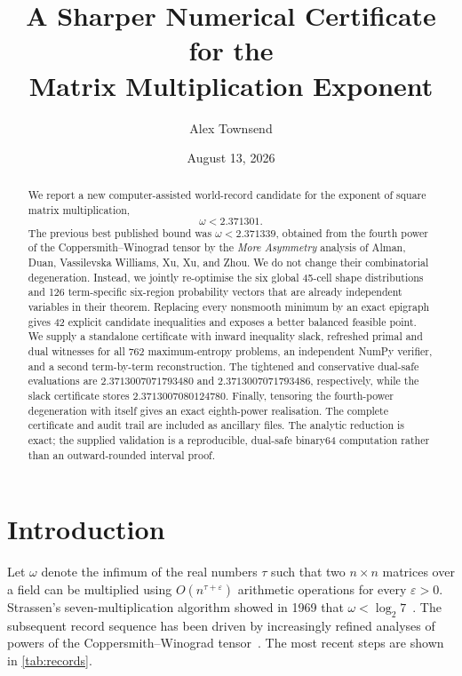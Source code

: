 \documentclass[11pt,reqno]{amsart}
\title[A sharper certificate for $\omega$]{A Sharper Numerical Certificate for the\\ Matrix Multiplication Exponent}
\author{Alex Townsend}
\date{August 13, 2026}
\theoremstyle{definition}
\theoremstyle{remark}
\newcommand{\eps}{\varepsilon}
\begin{document}
\begin{abstract}
We report a new computer-assisted world-record candidate for the exponent of square matrix multiplication,
\[
  \omega < 2.371301.
\]
The previous best published bound was $\omega<2.371339$, obtained from the fourth power of the
Coppersmith--Winograd tensor by the \emph{More Asymmetry} analysis of Alman, Duan,
Vassilevska Williams, Xu, Xu, and Zhou.  We do not change their combinatorial degeneration.
Instead, we jointly re-optimise the six global 45-cell shape distributions and 126 term-specific
six-region probability vectors that are already independent variables in their theorem.  Replacing every
nonsmooth minimum by an exact epigraph gives 42 explicit candidate inequalities and exposes a better
balanced feasible point.  We supply a standalone certificate with inward inequality slack, refreshed
primal and dual witnesses for all 762 maximum-entropy problems, an independent NumPy verifier, and a
second term-by-term reconstruction.  The tightened and conservative dual-safe evaluations are
$2.3713007071793480$ and $2.3713007071793486$, respectively, while the slack certificate stores
$2.3713007080124780$.  Finally, tensoring the fourth-power degeneration with itself gives
an exact eighth-power realisation.  The complete certificate and audit trail are included as ancillary
files.  The analytic reduction is exact; the supplied validation is a reproducible, dual-safe binary64
computation rather than an outward-rounded interval proof.
\end{abstract}

\maketitle

\section{Introduction}

Let $\omega$ denote the infimum of the real numbers $\tau$ such that two $n\times n$ matrices over a
field can be multiplied using $O(n^{\tau+\eps})$ arithmetic operations for every $\eps>0$.
Strassen's seven-multiplication algorithm showed in 1969 that $\omega<\log_2 7$~\cite{Strassen1969}.
The subsequent record sequence has been driven by increasingly refined analyses of powers of the
Coppersmith--Winograd tensor~\cite{CoppersmithWinograd1990}.  The most recent steps are shown in
\cref{tab:records}.
\end{document}
